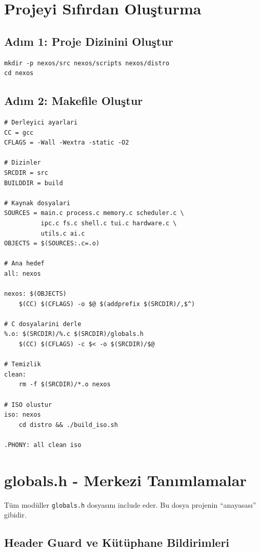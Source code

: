 \documentclass[12pt,a4paper]{report}
\begin{document}
\section{Projeyi Sıfırdan Oluşturma}

\subsection{Adım 1: Proje Dizinini Oluştur}

\begin{lstlisting}[style=bashstyle]
mkdir -p nexos/src nexos/scripts nexos/distro
cd nexos
\end{lstlisting}

\subsection{Adım 2: Makefile Oluştur}

\begin{lstlisting}[style=bashstyle,caption={Makefile}]
# Derleyici ayarlari
CC = gcc
CFLAGS = -Wall -Wextra -static -O2

# Dizinler
SRCDIR = src
BUILDDIR = build

# Kaynak dosyalari
SOURCES = main.c process.c memory.c scheduler.c \
          ipc.c fs.c shell.c tui.c hardware.c \
          utils.c ai.c
OBJECTS = $(SOURCES:.c=.o)

# Ana hedef
all: nexos

nexos: $(OBJECTS)
	$(CC) $(CFLAGS) -o $@ $(addprefix $(SRCDIR)/,$^)

# C dosyalarini derle
%.o: $(SRCDIR)/%.c $(SRCDIR)/globals.h
	$(CC) $(CFLAGS) -c $< -o $(SRCDIR)/$@

# Temizlik
clean:
	rm -f $(SRCDIR)/*.o nexos

# ISO olustur
iso: nexos
	cd distro && ./build_iso.sh

.PHONY: all clean iso
\end{lstlisting}

\section{globals.h - Merkezi Tanımlamalar}

Tüm modüller \texttt{globals.h} dosyasını include eder. Bu dosya projenin ``anayasası'' gibidir.

\subsection{Header Guard ve Kütüphane Bildirimleri}
\end{document}
